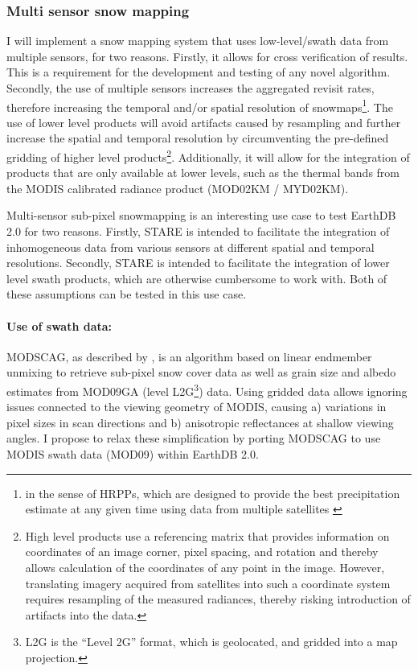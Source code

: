 \documentclass[letterpaper, parskip=half]{scrartcl}
\begin{document}
\subsubsection{Multi sensor snow mapping}
I will implement a snow mapping system that uses low-level/swath data from multiple sensors, for two reasons. Firstly, it allows for cross verification of results. This is a requirement for the development and testing of any novel algorithm. Secondly, the use of multiple sensors increases the aggregated revisit rates, therefore increasing the temporal and/or spatial resolution of snowmaps\footnote{in the sense of \glspl{HRPP}, which are designed to provide the best precipitation estimate at any given time using data from multiple satellites \citep{Lettenmaier2015}}.
The use of lower level products will avoid artifacts caused by resampling and further increase the spatial and temporal resolution by circumventing the pre-defined gridding of higher level products\footnote{High level products use a referencing matrix that provides information on coordinates of an image corner, pixel spacing, and rotation and thereby allows calculation of the coordinates of any point in the image.  However, translating imagery acquired from satellites into such a coordinate system requires resampling of the measured radiances, thereby risking introduction of artifacts into the data.}. Additionally, it will allow for the integration of products that are only available at lower levels, such as the thermal bands from the MODIS calibrated radiance product (MOD02KM / MYD02KM).

Multi-sensor sub-pixel snowmapping is an interesting use case to test EarthDB 2.0 for two reasons.
Firstly, \gls{STARE} is intended to facilitate the integration of inhomogeneous data from various sensors at different spatial and temporal resolutions. 
Secondly, \gls{STARE} is intended to facilitate the integration of lower level swath products, which are otherwise cumbersome to work with. Both of these assumptions can be tested in this use case.

\paragraph{Use of swath data:}
\gls{MODSCAG}, as described by \citep{Painter2009}, is an algorithm based on linear endmember unmixing to retrieve sub-pixel snow cover data as well as grain size and albedo estimates from MOD09GA (level \gls{L2G}\footnote{L2G is the ``Level 2G'' format, which is geolocated, and gridded into a map projection.}) data. 
Using gridded data allows ignoring issues connected to the viewing geometry of MODIS, causing a) variations in pixel sizes in scan directions and b) anisotropic reflectances at shallow viewing angles. I  propose to relax these simplification by porting MODSCAG to use MODIS swath data (MOD09) within EarthDB 2.0.
\end{document}
